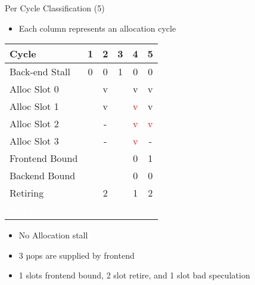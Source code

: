 \documentclass[aspectratio=169,10pt]{beamer}
\begin{document}
\begin{frame}{Per Cycle Classification (5)}
\begin{itemize}
  \item Each column represents an allocation cycle
\end{itemize}

\begin{center}
\begin{tabular}{|l|c|c|c|c|c|}
\hline
\rowcolor{red!20} Cycle & 1 & 2 & 3 & 4 & 5 \\
\hline
\rowcolor{red!20} Back-end Stall & 0 & 0 & 1 & 0 & 0 \\
\hline
\rowcolor{greenbar!50} Alloc Slot 0 & & v & & v & v \\
\hline
\rowcolor{greenbar!50} Alloc Slot 1 & & v & & \textcolor{red}{v} & v \\
\hline
\rowcolor{greenbar!50} Alloc Slot 2 & & - & & \textcolor{red}{v} & \textcolor{red}{v} \\
\hline
\rowcolor{greenbar!50} Alloc Slot 3 & & - & & \textcolor{red}{v} & - \\
\hline
\rowcolor{frontendbound} Frontend Bound & & & & 0 & 1 \\
\hline
\rowcolor{backendbound} Backend Bound & & & & 0 & 0 \\
\hline
\rowcolor{retiring} Retiring & & 2 & & 1 & 2 \\
\hline
\rowcolor{badspec} \textcolor{white}{Bad Speculation} & & & & \textcolor{white}{3} & \textcolor{white}{1} \\
\hline
\end{tabular}
\end{center}

\begin{itemize}
  \item No Allocation stall
  \item 3 µops are supplied by frontend
  \item 1 slots frontend bound, 2 slot retire, and 1 slot bad speculation
\end{itemize}
\end{frame}
\end{document}
